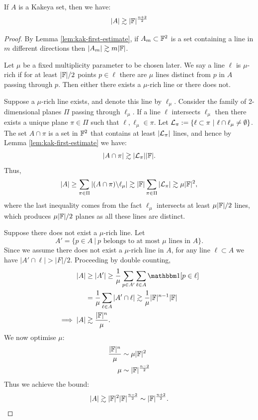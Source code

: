 \begin{theorem}
    If $A$ is a Kakeya set, then we have:
    \[
        |A| \gtrsim |\mathbb F|^{\frac{n+2}{2}}    
    \]
\end{theorem}
\begin{proof}
By Lemma \ref{lem:kak-first-estimate}, if $A_m \subset \mathbb F^2$ is a set containing a line in $m$ different directions then $|A_m| \gtrsim m|\mathbb F|$.

Let $\mu$ be a fixed multiplicity parameter to be chosen later. We say a line $\ell$ is $\mu$-rich if for at least $|\mathbb F|/2$ points $p\in \ell$ there are $\mu$ lines distinct from $p$
in $A$ passing through $p$. Then either there exists a $\mu$-rich line or there does not. 

Suppose a $\mu$-rich line exists, and denote this line by $\ell_\mu$. Consider the family of 2-dimensional planes $\Pi$ passing through $\ell_\mu$. 
If a line $\ell$ intersects $\ell_\mu$ then there exists a unique plane $\pi \in \Pi$ such that $\ell, \ell_\mu \in \pi$. 
Let $\mathcal L_\pi := \{\ell \subset \pi \ | \ \ell \cap \ell_\mu \neq \emptyset \}$. The set $A \cap \pi$ is a set in $\mathbb F^2$ that contains at least $|\mathcal L_\pi|$
lines, and hence by Lemma \ref{lem:kak-first-estimate} we have:
\[
|A \cap \pi| \gtrsim |\mathcal L_\pi| |\mathbb F|.
\]
Thus,
\[
    |A| \geq \sum_{\pi \in \Pi} |(A \cap \pi) \backslash \ell_\mu| \gtrsim |\mathbb F| \sum_{\pi \in \Pi} |\mathcal L_\pi| \gtrsim \mu |\mathbb F|^2,
\]
where the last inequality comes from the fact $\ell_\mu$ intersects at least $\mu |\mathbb F|/2$ lines, which produces $\mu |\mathbb F|/2$ planes as all these lines are distinct.

Suppose there does not exist a $\mu$-rich line. Let 
\[
    A' = \{p \in A \ | \ p \text{ belongs to at most } \mu \text{ lines in }A \}.
\]
Since we assume there does not exist a $\mu$-rich line in $A$, for any line $\ell \subset A$ we have $|A' \cap \ell| > |F|/2$. 
Proceeding by double counting, 
\begin{align*}
    |A| &\geq |A'|\geq \frac{1}{\mu} \sum_{p \in A'} \sum_{\ell \in A} \OO[p \in \ell] \\
    &= \frac{1}{\mu} \sum_{\ell \in A} |A' \cap \ell| \gtrsim \frac{1}{\mu} |\FF|^{n-1}|\FF|\\
    \implies |A| &\gtrsim \frac{|\FF|^n}{\mu}.
\end{align*}
We now optimise $\mu$:
\begin{align*}
    \frac{|\mathbb F|^n}{\mu} &\sim \mu |\mathbb F|^2 \\
    \mu &\sim |\mathbb F|^{\frac{n-2}{2}}
\end{align*}
Thus we achieve the bound:
\[
    |A| \gtrsim |\mathbb F|^2|\mathbb F|^{\frac{n-2}{2}} \sim |\mathbb F|^{\frac{n+2}{2}}.
\]
\end{proof}

